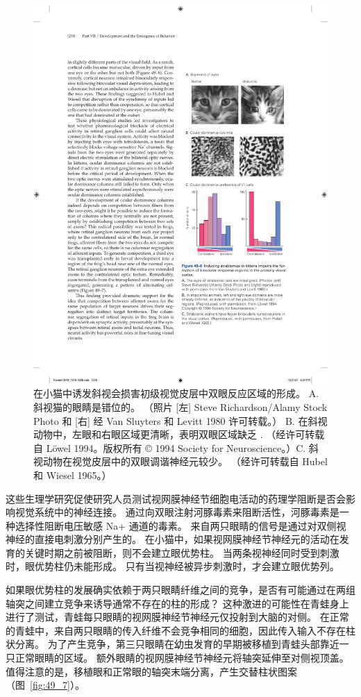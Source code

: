 \begin{figure}[htbp]
	\centering
	\includegraphics[width=0.5\linewidth]{chap49/fig_49_6}
	\caption{在小猫中诱发斜视会损害初级视觉皮层中双眼反应区域的形成。 A. 斜视猫的眼睛是错位的。 （照片 [左] Steve Richardson/Alamy Stock Photo 和 [右] 经 Van Sluyters 和 Levitt 1980 许可转载。） B. 在斜视动物中，左眼和右眼区域更清晰，表明双眼区域缺乏 . （经许可转载自 Löwel 1994。版权所有 © 1994 Society for Neuroscience。）C. 斜视动物在视觉皮层中的双眼调谐神经元较少。 （经许可转载自 Hubel 和 Wiesel 1965。）}
	\label{fig:49_6}
\end{figure}


这些生理学研究促使研究人员测试视网膜神经节细胞电活动的药理学阻断是否会影响视觉系统中的神经连接。
通过向双眼注射河豚毒素来阻断活性，河豚毒素是一种选择性阻断电压敏感 Na+ 通道的毒素。
来自两只眼睛的信号是通过对双侧视神经的直接电刺激分别产生的。
在小猫中，如果视网膜神经节神经元的活动在发育的关键时期之前被阻断，则不会建立眼优势柱。
当两条视神经同时受到刺激时，眼优势柱仍未能形成。
只有当视神经被异步刺激时，才会建立眼优势列。


如果眼优势柱的发展确实依赖于两只眼睛纤维之间的竞争，是否有可能通过在两组轴突之间建立竞争来诱导通常不存在的柱的形成？
这种激进的可能性在青蛙身上进行了测试，青蛙每只眼睛的视网膜神经节神经元仅投射到大脑的对侧。
在正常的青蛙中，来自两只眼睛的传入纤维不会竞争相同的细胞，因此传入输入不存在柱状分离。
为了产生竞争，第三只眼睛在幼虫发育的早期被移植到青蛙头部靠近一只正常眼睛的区域。
额外眼睛的视网膜神经节神经元将轴突延伸至对侧视顶盖。
值得注意的是，移植眼和正常眼的轴突末端分离，产生交替柱状图案（图~\ref{fig:49_7}）。


